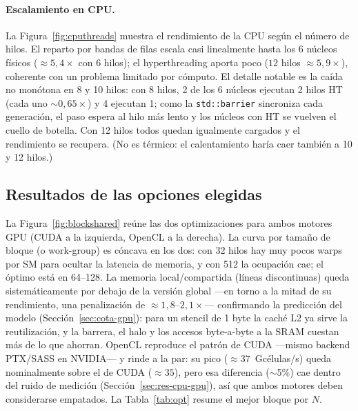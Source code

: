 \documentclass[
	spanish,
	letterpaper, oneside
]{article}
\begin{document}
\paragraph{Escalamiento en CPU.} La Figura~\ref{fig:cputhreads} muestra el
rendimiento de la CPU según el número de hilos. El reparto por bandas de filas escala
casi linealmente hasta los 6 núcleos físicos ($\approx 5{,}4\times$ con 6
hilos); el hyperthreading aporta poco ($12$ hilos $\approx 5{,}9\times$),
coherente con un problema limitado por cómputo. El detalle notable es la caída
no monótona en 8 y 10 hilos: con 8 hilos, 2 de los 6 núcleos ejecutan 2 hilos HT
(cada uno $\sim 0{,}65\times$) y 4 ejecutan 1; como la \texttt{std::barrier} sincroniza
cada generación, el paso espera al hilo más lento y los núcleos con HT se vuelven el
cuello de botella. Con 12 hilos todos quedan igualmente cargados y el rendimiento se
recupera. (No es térmico: el calentamiento haría caer también a 10 y 12 hilos.)


\subsection{Resultados de las opciones elegidas}
\label{sec:res-opciones}

La Figura~\ref{fig:blockshared} reúne las dos optimizaciones para ambos motores GPU
(CUDA a la izquierda, OpenCL a la derecha). La curva por tamaño de bloque (o
work-group) es cóncava en los dos: con 32 hilos hay muy pocos warps por
SM para ocultar la latencia de memoria, y con 512 la ocupación cae; el óptimo está en
64--128. La memoria local/compartida (líneas discontinuas) queda
sistemáticamente por debajo de la versión global ---en torno a la mitad de su
rendimiento, una penalización de $\approx 1{,}8$--$2{,}1\times$--- confirmando la
predicción del modelo (Sección~\ref{sec:cota-gpu}): para un stencil de 1 byte
la caché L2 ya sirve la reutilización, y la barrera, el halo y los accesos
byte-a-byte a la SRAM cuestan más de lo que ahorran. OpenCL reproduce el
patrón de CUDA ---mismo backend PTX/SASS en NVIDIA--- y rinde a la par: su pico
($\approx 37$~Gcélulas/s) queda nominalmente sobre el de CUDA ($\approx 35$), pero esa
diferencia ($\sim$5\%) cae dentro del ruido de medición (Sección~\ref{sec:res-cpu-gpu}),
así que ambos motores deben considerarse empatados. La Tabla~\ref{tab:opt} resume el
mejor bloque por $N$.
\end{document}
